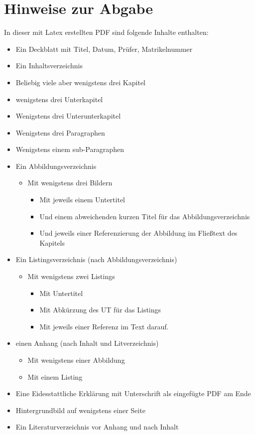 \section{Hinweise zur Abgabe}

In dieser mit Latex erstellten PDF sind folgende Inhalte enthalten: 

\begin{itemize}
    \item Ein Deckblatt mit Titel, Datum, Prüfer, Matrikelnummer
    \item Ein Inhaltsverzeichnis
    \item Beliebig viele aber wenigstens drei Kapitel
    \item wenigstens drei Unterkapitel
    \item Wenigstens drei Unterunterkapitel
    \item Wenigstens drei Paragraphen 
    \item Wenigstens einem sub-Paragraphen
    \item Ein Abbildungsverzeichnis 
    \begin{itemize}
        \item Mit wenigstens drei Bildern
        \begin{itemize}
            \item Mit jeweils einem Untertitel 
            \item Und einem abweichenden kurzen Titel für das Abbildungsverzeichnis 
            \item Und jeweils einer Referenzierung der Abbildung im Fließtext des Kapitels
        \end{itemize}
    \end{itemize}
    \item Ein Listingsverzeichnis (nach Abbildungsverzeichnis)
        \begin{itemize}
            \item Mit wenigstens zwei Listings 
                \begin{itemize}
                    \item Mit Untertitel 
                    \item Mit Abkürzung des UT für das Listings
                    \item Mit jeweils einer Referenz im Text darauf. 
                \end{itemize}
        \end{itemize}
    \item einen Anhang (nach Inhalt und Litverzeichnis)
        \begin{itemize}
            \item Mit wenigstens einer Abbildung 
            \item Mit einem Listing 
        \end{itemize}
    \item Eine Eidesstattliche Erklärung mit Unterschrift als eingefügte PDF am Ende
    \item Hintergrundbild auf wenigstens einer Seite 
    \item Ein Literaturverzeichnis vor Anhang und nach Inhalt
\end{itemize}